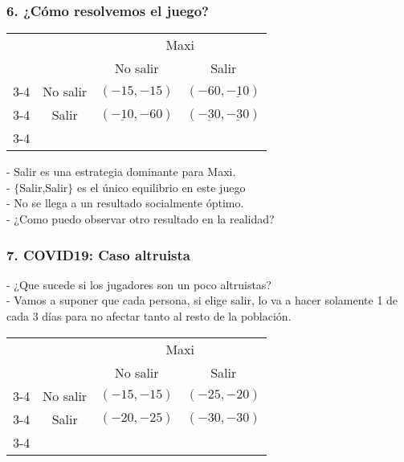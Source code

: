 \documentclass[14pt]{beamer}
\begin{document}
\begin{frame}
\frametitle{6. ¿Cómo resolvemos el juego?}
\begin{table}
     \begin{tabular}{cc|c|c|}
      & \multicolumn{1}{c}{} & \multicolumn{2}{c}{Maxi}\\
      & \multicolumn{1}{c}{} & \multicolumn{1}{c}{No salir}  & \multicolumn{1}{c}{Salir} \\\cline{3-4}
      \multirow{}{Gaby}  & No salir & $(-15,-15)$ & $(-60,\underline{-10})$ \\\cline{3-4}
      & Salir & $(\underline{-10},-60)$ & $(\underline{-30},\underline{-30})$ \\\cline{3-4}
    \end{tabular}
  \end{table}
  - Salir es una estrategia dominante para Maxi. \\
  - $\lbrace$Salir,Salir$\rbrace$ es el único equilibrio en este juego \\
  - No se llega a un resultado socialmente óptimo.\\
  - ¿Como puedo observar otro resultado en la realidad?
\end{frame}

\begin{frame}
\frametitle{7. COVID19: Caso altruista}
 - ¿Que sucede si los jugadores son un poco altruistas?\\
 - Vamos a suponer que cada persona, si elige salir, lo va a hacer solamente 1 de cada 3 días para  no afectar tanto al resto de la población.
\begin{table}
     \begin{tabular}{cc|c|c|}
      & \multicolumn{1}{c}{} & \multicolumn{2}{c}{Maxi}\\
      & \multicolumn{1}{c}{} & \multicolumn{1}{c}{No salir}  & \multicolumn{1}{c}{Salir} \\\cline{3-4}
      \multirow{}{Gaby}  & No salir & $(-15,-15)$ & $(-25,-20)$ \\\cline{3-4}
      & Salir & $(-20,-25)$ & $(-30,-30)$ \\\cline{3-4}
    \end{tabular}
  \end{table}
\end{frame}
\end{document}
